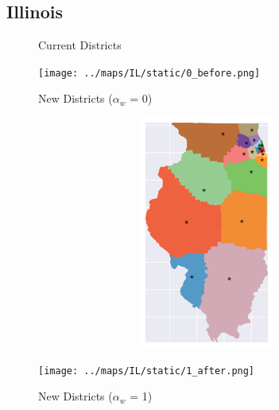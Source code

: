 \subsection{Illinois}
\begin{figure}[htb!] \centering
\caption{ Current Districts }
\texttt{[image: ../maps/IL/static/0\_before.png]}
\caption{ New Districts ($\alpha_w$ = 0) }
\includegraphics[width=5in,height=3in,keepaspectratio]{../maps/IL/static/0_after.png}
\caption{ New Districts ($\alpha_w$ = 1) }
\texttt{[image: ../maps/IL/static/1\_after.png]}
\end{figure}

\clearpage
\newpage

